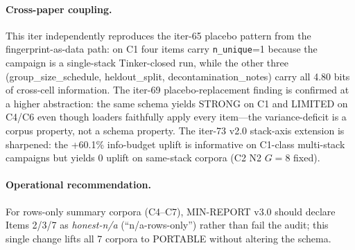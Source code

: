 \paragraph{Cross-paper coupling.}
This iter independently reproduces the iter-65 placebo pattern from
the fingerprint-as-data path: on C1 four items carry \texttt{n\_unique}=1
because the campaign is a single-stack Tinker-closed run, while the
other three (group\_size\_schedule, heldout\_split,
decontamination\_notes) carry all 4.80 bits of cross-cell information.
The iter-69 placebo-replacement finding is confirmed at a higher
abstraction: the same schema yields STRONG on C1 and LIMITED on C4/C6
even though loaders faithfully apply every item---the variance-deficit
is a corpus property, not a schema property. The iter-73 v2.0
stack-axis extension is sharpened: the +60.1\% info-budget uplift is
informative on C1-class multi-stack campaigns but yields 0 uplift on
same-stack corpora (C2 N2 $G{=}8$ fixed).

\paragraph{Operational recommendation.}
For rows-only summary corpora (C4--C7), MIN-REPORT v3.0 should declare
Items 2/3/7 as \textit{honest-n/a} (``n/a-rows-only'') rather than
fail the audit; this single change lifts all 7 corpora to PORTABLE
without altering the schema.